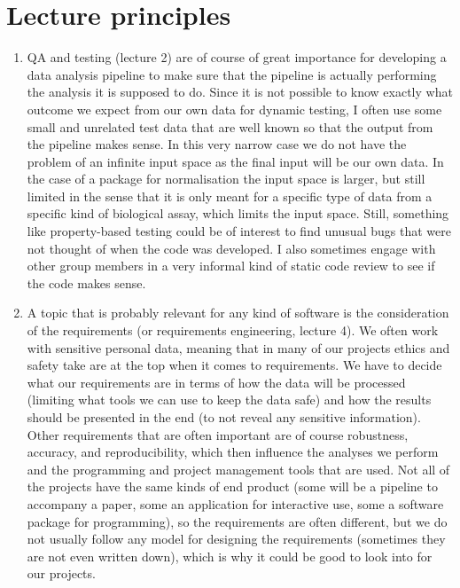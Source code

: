 \documentclass[11pt]{article}
\begin{document}
\section{Lecture principles}
\begin{enumerate}
    \item QA and testing (lecture 2) are of course of great importance for developing a data analysis pipeline to make sure that the pipeline is actually performing the analysis it is supposed to do. Since it is not possible to know exactly what outcome we expect from our own data for dynamic testing, I often use some small and unrelated test data that are well known so that the output from the pipeline makes sense. In this very narrow case we do not have the problem of an infinite input space as the final input will be our own data. In the case of a package for normalisation the input space is larger, but still limited in the sense that it is only meant for a specific type of data from a specific kind of biological assay, which limits the input space. Still, something like property-based testing could be of interest to find unusual bugs that were not thought of when the code was developed.
    I also sometimes engage with other group members in a very informal kind of static code review to see if the code makes sense. 
    
    \item A topic that is probably relevant for any kind of software is the consideration of the requirements (or requirements engineering, lecture 4). We often work with sensitive personal data, meaning that in many of our projects ethics and safety take are at the top when it comes to requirements. We have to decide what our requirements are in terms of how the data will be processed (limiting what tools we can use to keep the data safe) and how the results should be presented in the end (to not reveal any sensitive information). Other requirements that are often important are of course robustness, accuracy, and reproducibility, which then influence the analyses we perform and the programming and project management tools that are used. Not all of the projects have the same kinds of end product (some will be a pipeline to accompany a paper, some an application for interactive use, some a software package for programming), so the requirements are often different, but we do not usually follow any model for designing the requirements (sometimes they are not even written down), which is why it could be good to look into for our projects.
\end{enumerate}
\end{document}
